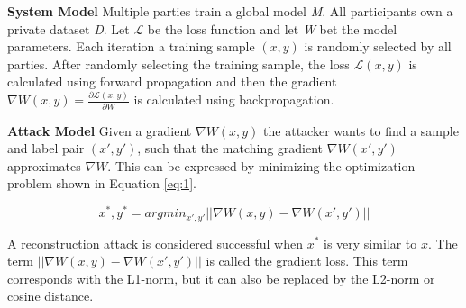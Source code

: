 \textbf{System Model}
Multiple parties train a global model \textit{M}. All participants own a private dataset \textit{D}. Let $\mathcal{L}$ be the loss function and let \textit{W} bet the model parameters. Each iteration a training sample $(x,y)$ is randomly selected by all parties. After randomly selecting the training sample, the loss $\mathcal{L}(x,y)$ is calculated using forward propagation and then the gradient $\nabla W(x,y) = \frac{\partial \mathcal{L}(x,y)}{\partial W}$ is calculated using backpropagation.


\textbf{Attack Model}
Given a gradient $\nabla W(x,y)$ the attacker wants to find a sample and label pair $(x',y')$, such that the matching gradient $\nabla W(x',y')$ approximates $\nabla W$. This can be expressed by minimizing the optimization problem shown in Equation \ref{eq:1}.

\begin{equation}
    \label{eq:1}
    x^*,y^* = argmin_{x',y'} ||\nabla W(x,y) - \nabla W(x',y')||
\end{equation}

A reconstruction attack is considered successful when $x^*$ is very similar to $x$. The term $||\nabla W(x,y) - \nabla W(x',y')||$ is called the gradient loss. This term corresponds with the L1-norm, but it can also be replaced by the L2-norm or cosine distance.

